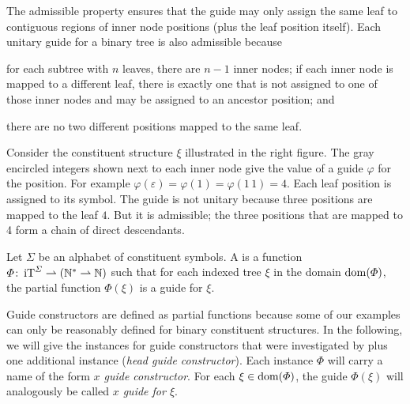 \documentclass[../../document.tex]{subfiles}
\begin{document}
    The admissible property ensures that the guide may only assign the same leaf to contiguous regions of inner node positions (plus the leaf position itself).
    Each unitary guide for a binary tree is also admissible because
    \begin{inparaenum}
        \item for each subtree with \(n\) leaves, there are \(n-1\) inner nodes; if each inner node is mapped to a different leaf, there is exactly one that is not assigned to one of those inner nodes and may be assigned to an ancestor position; and
        \item there are no two different positions mapped to the same leaf.
    \end{inparaenum}

    \bigskip

    \begin{wrapfigure}[6]{r}{.3\linewidth}
        
    \end{wrapfigure}
    \parexample*
    Consider the constituent structure \(\xi\) illustrated in the right figure.
    The gray encircled integers shown next to each inner node give the value of a guide \(\varphi\) for the position.
    For example \(\varphi(\varepsilon) = \varphi(1) = \varphi(1\,1) = 4\).
    Each leaf position is assigned to its symbol.
    The guide is not unitary because three positions are mapped to the leaf $4$.
    But it is admissible; the three positions that are mapped to 4 form a chain of direct descendants.
    \\\null\exampleqed

    \begin{definition}
        Let \(\varSigma\) be an alphabet of constituent symbols.
        A  is a function \(\varPhi\colon \operatorname{iT}^\varSigma \rightharpoonup (\mathbb{N}^* \rightharpoonup \mathbb{N})\) such that for each indexed tree \(\xi\) in the domain \(\operatorname{dom}(\varPhi)\), the partial function \(\varPhi(\xi)\) is a guide for \(\xi\).
    \end{definition}

    Guide constructors are defined as partial functions because some of our examples can only be reasonably defined for binary constituent structures.
    In the following, we will give the instances for guide constructors that were investigated by \citet{Rup22} plus one additional instance (\emph{head guide constructor}).
    Each instance \(\varPhi\) will carry a name of the form \emph{\(x\) guide constructor}.
    For each \(\xi \in \operatorname{dom}(\varPhi)\), the guide \(\varPhi(\xi)\) will analogously be called \emph{\(x\) guide for \(\xi\)}.
\end{document}
